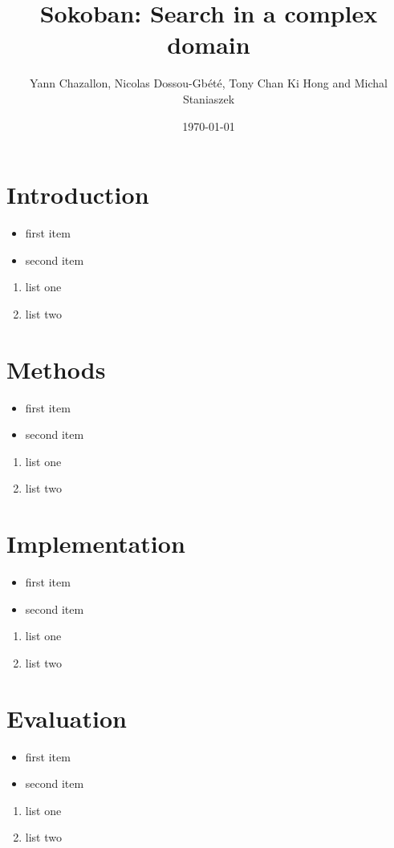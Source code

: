 \documentclass{beamer}
\title[Sokoban] %
{Sokoban: Search in a complex domain}
\author[Chazallon, Dossou-Gb{\'e}t{\'e}, Hong, Staniaszek]{Yann Chazallon,  Nicolas Dossou-Gb{\'e}t{\'e}, Tony Chan Ki Hong and Michal Staniaszek}
\date{\today}
\begin{document}
\begin{frame}
  \titlepage
\end{frame}

\section{Introduction}

\begin{frame}
  \begin{itemize}
  \item first item
  \item second item
  \end{itemize}
  \begin{enumerate}
  \item list one
  \item list two
  \end{enumerate}
\end{frame}

\section{Methods}
\begin{frame}
  \begin{itemize}
  \item first item
  \item second item
  \end{itemize}
  \begin{enumerate}
  \item list one
  \item list two
  \end{enumerate}
\end{frame}
\section{Implementation}
\begin{frame}
  \begin{itemize}
  \item first item
  \item second item
  \end{itemize}
  \begin{enumerate}
  \item list one
  \item list two
  \end{enumerate}
\end{frame}
\section{Evaluation}
\begin{frame}
  \begin{itemize}
  \item first item
  \item second item
  \end{itemize}
  \begin{enumerate}
  \item list one
  \item list two
  \end{enumerate}
\end{frame}
\end{document}
